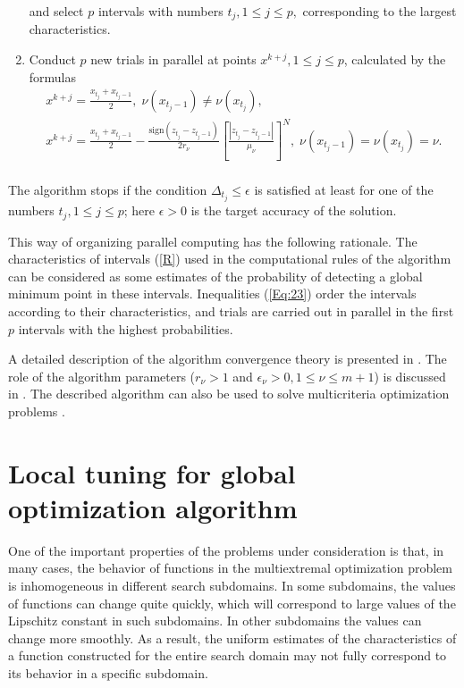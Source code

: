 \documentclass[
11pt,%
tightenlines,%
twoside,%
onecolumn,%
nofloats,%
nobibnotes,%
nofootinbib,%
superscriptaddress,%
noshowpacs,%
centertags]%
{revtex4}
\begin{document}
\begin{enumerate}
and select $p$ intervals with numbers $t_j, 1\leq j \leq p,$ corresponding to the largest characteristics.
\item
Conduct $p$ new trials in parallel at points $x^{k+j}, 1 \leq j \leq p$, calculated by the formulas
\begin{gather*}
x^{k+j}=\frac{x_{t_j}+x_{t_j-1}}{2}, \; \nu(x_{t_j-1})\neq \nu(x_{t_j}), \\
x^{k+j}=\frac{x_{t_j}+x_{t_j-1}}{2}- \frac{\mathrm{sign}(z_{t_j}-z_{t_j-1})}{2r_\nu}\left[\frac{\left|z_{t_j}-z_{t_j-1}\right|}{\mu_\nu}\right]^N, \; \nu(x_{t_j-1})=\nu(x_{t_j})=\nu. \\
\end{gather*}
\end{enumerate}

The algorithm stops if the condition $\Delta_{t_j}\leq \epsilon$ is
satisfied at least for one of the numbers $t_j, 1\leq j \leq p$;
here $\epsilon>0$ is the target accuracy of the solution.

This way of organizing parallel computing has the  following
rationale. The characteristics of intervals (\ref{R}) used in the
computational rules of the algorithm can be considered as some
estimates of the probability of detecting a global minimum point in
these intervals. Inequalities (\ref{Eq:23}) order the intervals
according to their characteristics, and trials are carried out in
parallel in the first $p$ intervals with the highest probabilities.

A detailed description of the algorithm convergence theory is presented in \cite{Strongin2000,Strongin2013}.
The role of the algorithm parameters ($r_\nu>1$ and $\epsilon_\nu>0, 1\leq\nu\leq m+1$) is discussed in \cite{Strongin2020}.
The described algorithm can also be used to solve multicriteria optimization problems \cite{Gergel2020}.

\section{Local tuning for global optimization algorithm}

One of the important properties of the problems under consideration is that, in many cases, the behavior of functions in the multiextremal optimization problem is inhomogeneous in different search subdomains. In some subdomains, the values of functions can change quite quickly, which will correspond to large values of the Lipschitz constant in such subdomains. In other subdomains the values can change more smoothly. As a result, the uniform estimates of the characteristics of a function constructed for the entire search domain may not fully correspond to its behavior in a specific subdomain.
\end{document}
